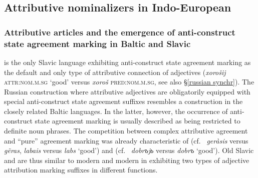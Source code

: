 \subsection{Attributive nominalizers in Indo-European} \label{ie diachr}

\subsubsection[Baltic and Slavic]{Attributive articles and the emergence of anti\hyp{}construct state agreement marking in Baltic and Slavic} \label{slavic diachr}

 is the only Slavic language exhibiting anti\hyp{}construct state agreement marking as the default and only type of attributive connection of adjectives (\textit{xorošij} \textsc{attr:nom.m.sg} ‘good’ versus \textit{xoroš} \textsc{pred:nom.m.sg}, see also \S\ref{russian synchr}). The Russian construction where attributive adjectives are obligatorily equipped with special anti\hyp{}construct state agreement suffixes resembles a construction in the closely related Baltic languages. In the latter, however, the occurrence of anti\hyp{}construct state agreement marking is usually described as being restricted to definite noun phrases. The competition between complex attributive agreement and “pure” agreement marking was already characteristic of  (cf.~ \textit{geràsis} versus \textit{g{\~e}ras},  \textit{labais} versus \textit{labs} ‘good’) and  (cf.~ \textit{dobrъjь} versus \textit{dobrъ} ‘good’). Old Slavic and  are thus similar to modern  and modern  in exhibiting two types of adjective attribution marking suffixes in different functions.

